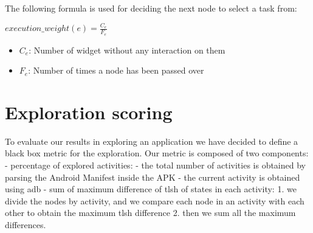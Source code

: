 The following formula is used for deciding the next node to select a
task from:

\(execution\_weight(e)=\frac{C_e}{F_e}\)

\begin{itemize}
\tightlist
\item
  \(C_e\): Number of widget without any interaction on them
\item
  \(F_e\): Number of times a node has been passed over
\end{itemize}

\section{Exploration scoring}\label{exploration-scoring}

To evaluate our results in exploring an application we have decided to
define a black box metric for the exploration. Our metric is composed of
two components: - percentage of explored activities: - the total number
of activities is obtained by parsing the Android Manifest inside the APK
- the current activity is obtained using adb - sum of maximum difference
of tlsh of states in each activity: 1. we divide the nodes by activity,
and we compare each node in an activity with each other to obtain the
maximum tlsh difference 2. then we sum all the maximum differences.

